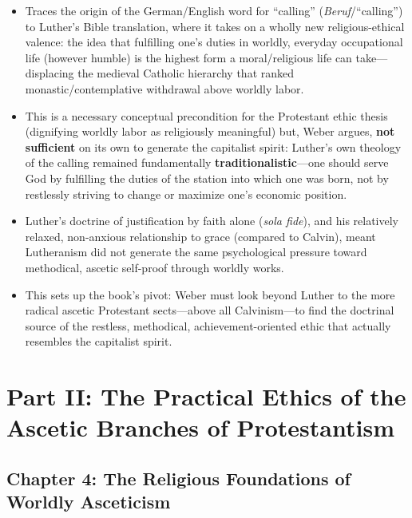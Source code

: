 \documentclass[12pt]{article}
\begin{document}
\begin{itemize}[leftmargin=*, itemsep=4pt]
    \item Traces the origin of the German/English word for ``calling'' (\textit{Beruf}/``calling'') to Luther's Bible translation, where it takes on a wholly new religious-ethical valence: the idea that fulfilling one's duties in worldly, everyday occupational life (however humble) is the highest form a moral/religious life can take---displacing the medieval Catholic hierarchy that ranked monastic/contemplative withdrawal above worldly labor.
    \item This is a necessary conceptual precondition for the Protestant ethic thesis (dignifying worldly labor as religiously meaningful) but, Weber argues, \textbf{not sufficient} on its own to generate the capitalist spirit: Luther's own theology of the calling remained fundamentally \textbf{traditionalistic}---one should serve God by fulfilling the duties of the station into which one was born, not by restlessly striving to change or maximize one's economic position.
    \item Luther's doctrine of justification by faith alone (\textit{sola fide}), and his relatively relaxed, non-anxious relationship to grace (compared to Calvin), meant Lutheranism did not generate the same psychological pressure toward methodical, ascetic self-proof through worldly works.
    \item This sets up the book's pivot: Weber must look beyond Luther to the more radical ascetic Protestant sects---above all Calvinism---to find the doctrinal source of the restless, methodical, achievement-oriented ethic that actually resembles the capitalist spirit.
\end{itemize}

\section{Part II: The Practical Ethics of the Ascetic Branches of Protestantism}

\subsection*{Chapter 4: The Religious Foundations of Worldly Asceticism}
\end{document}
